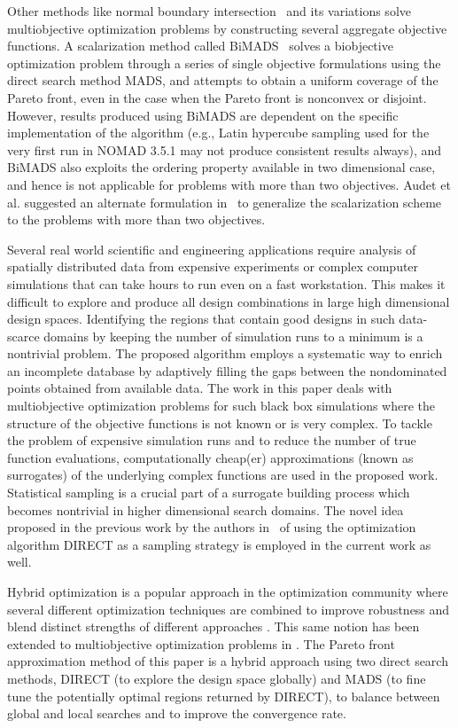 Other methods like normal boundary intersection \DD\ and its variations solve 
multiobjective optimization problems by constructing several aggregate 
objective functions. A scalarization method called BiMADS \ASZ\ solves a 
biobjective optimization problem through a series of single objective 
formulations using the direct search method MADS, and attempts to obtain a 
uniform coverage of the Pareto front, even in the case when the Pareto front 
is nonconvex or disjoint. However, results produced using BiMADS
are dependent on the specific implementation of the algorithm (e.g., Latin
hypercube sampling used for the very first run in NOMAD 3.5.1 may not produce
consistent results always), and BiMADS also exploits the ordering property
available in two dimensional case, and hence is not applicable for problems 
with more than two objectives. Audet et al. suggested an alternate formulation 
in \ASZ\ to generalize the scalarization scheme to the problems with more 
than two objectives. 

Several real world scientific and engineering applications require analysis of 
spatially distributed data from expensive experiments or complex computer 
simulations that can take hours to run even on a fast workstation. This makes 
it difficult to explore and produce all design combinations in large high 
dimensional design spaces. Identifying the regions that contain good designs in 
such data-scarce domains by keeping the number of simulation runs to 
a minimum is a nontrivial problem. The proposed algorithm employs 
a systematic way to enrich an incomplete database by adaptively 
filling the gaps between the nondominated points obtained from available data. 
The work in this paper deals with multiobjective optimization problems for 
such black box simulations where the structure of the objective functions is 
not known or is very complex. To tackle the problem of expensive simulation 
runs and to reduce the number of true function evaluations, computationally 
cheap(er) approximations (known as surrogates) of the underlying complex 
functions are used in the proposed work. Statistical sampling is a crucial 
part of a surrogate building process which becomes nontrivial in higher 
dimensional search domains. The novel idea proposed in the previous work by the
authors in \DWC\ of using the optimization algorithm DIRECT as a sampling 
strategy is employed in the current work as well. 

Hybrid optimization is a popular approach in the optimization community where 
several different optimization techniques are combined to improve robustness 
and blend distinct strengths of different approaches \GF. This same 
notion has been extended to multiobjective optimization problems in \WIHM. 
The Pareto front approximation method of this paper is a hybrid approach using 
two direct search methods, DIRECT (to explore the design space globally) and 
MADS (to fine tune the potentially optimal regions returned by DIRECT), to 
balance between global and local searches and to improve the convergence rate.

